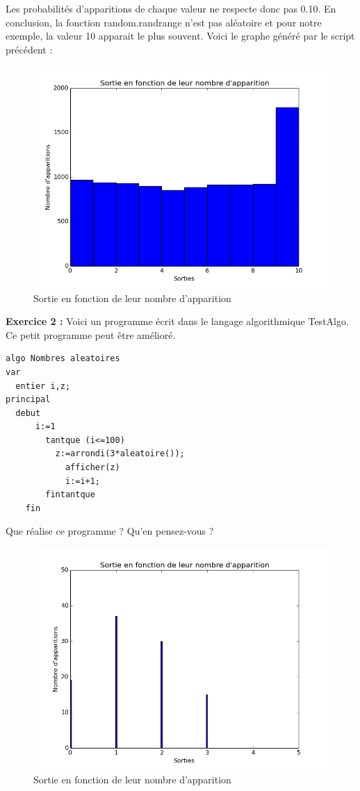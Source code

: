 \documentclass[oneside]{book}
\begin{document}
Les probabilités d'apparitions de chaque valeur ne respecte donc pas 0.10. En conclusion, la fonction random.randrange n'est pas aléatoire et pour notre exemple, la valeur 10 apparait le plus souvent.
\newpage
Voici le graphe généré par le script précédent : 
\begin{figure}[h!]
	\centering
	\includegraphics[width=\textwidth]{Nombre_pseudo-aleatoires_exo1.png}
	\caption{Sortie en fonction de leur nombre d'apparition}
	\label{fig:cc40}
\end{figure}
\newline
\textbf{Exercice 2 :}
Voici un programme écrit dans le langage algorithmique TestAlgo.
Ce petit programme peut être amélioré.
\begin{lstlisting}[frame=single]
algo Nombres aleatoires
var
  entier i,z;
principal
  debut
	  i:=1
		tantque (i<=100)
		  z:=arrondi(3*aleatoire());
			afficher(z)
			i:=i+1;
		fintantque
	fin
\end{lstlisting} 
\newpage Que réalise ce programme ? Qu'en pensez-vous ? \newline 
\begin{figure}[h!]
	\centering
	\includegraphics[width=\textwidth]{Nombre_pseudo-aleatoires_exo2.png}
	\caption{Sortie en fonction de leur nombre d'apparition}
	\label{fig:cc40}
\end{figure}
\end{document}
